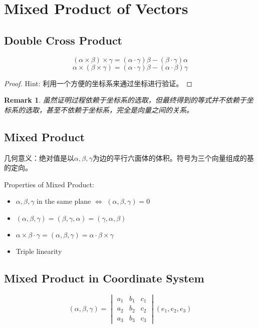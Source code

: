 \documentclass[onecolumn]{ctexart}
\newtheorem{remark}{Remark}
\begin{document}
\section{Mixed Product of Vectors}

\subsection{Double Cross Product}

\begin{equation}
  (\alpha \times \beta) \times \gamma = (\alpha \cdot \gamma) \beta - (\beta \cdot \gamma) \alpha
\end{equation}
\begin{equation}
  \alpha \times (\beta \times \gamma) = (\alpha \cdot \gamma) \beta - (\alpha \cdot \beta) \gamma
\end{equation}
\begin{proof}
  Hint: 利用一个方便的坐标系来通过坐标进行验证。
\end{proof}
\begin{remark}
  虽然证明过程依赖于坐标系的选取，但最终得到的等式并不依赖于坐标系的选取，甚至不依赖于坐标系，完全是向量之间的关系。
\end{remark}

\subsection{Mixed Product}

几何意义：绝对值是以$\alpha, \beta, \gamma$为边的平行六面体的体积。符号为三个向量组成的基的定向。

Properties of Mixed Product:
\begin{itemize}
  \item $\alpha, \beta, \gamma$ in the same plane $\Leftrightarrow$ $(\alpha, \beta, \gamma) = 0$
  \item $(\alpha, \beta, \gamma) = (\beta, \gamma, \alpha) = (\gamma, \alpha, \beta)$
  \item $\alpha \times \beta \cdot \gamma = (\alpha, \beta, \gamma) = \alpha \cdot \beta \times \gamma$
  \item Triple linearity
\end{itemize}

\subsection{Mixed Product in Coordinate System}

\begin{equation}
  (\alpha, \beta, \gamma) = 
  \begin{vmatrix}
    a_1 & b_1 & c_1 \\
    a_2 & b_2 & c_2 \\
    a_3 & b_3 & c_3
  \end{vmatrix}
  (e_1, e_2, e_3)
\end{equation}
\end{document}
